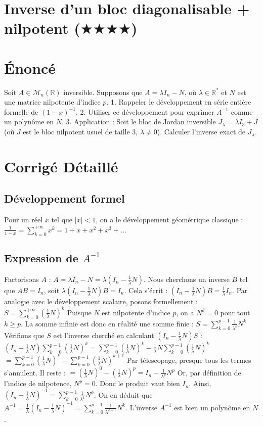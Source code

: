 \documentclass[11pt,a4paper]{article}
\begin{document}
\section{Inverse d'un bloc diagonalisable + nilpotent ($\bigstar$$\bigstar$$\bigstar$$\bigstar$)}

\section{Énoncé}
Soit $A \in \mathcal{M}_n(\mathbb{R})$ inversible.
Supposons que $A = \lambda I_n - N$, où $\lambda \in \mathbb{R}^*$ et $N$ est une matrice nilpotente d'indice $p$.
1. Rappeler le développement en série entière formelle de $(1 - x)^{-1}$.
2. Utiliser ce développement pour exprimer $A^{-1}$ comme un polynôme en $N$.
3. Application : Soit le bloc de Jordan inversible $J_{\lambda} = \lambda I_3 + J$ (où $J$ est le bloc nilpotent usuel de taille 3, $\lambda \neq 0$). Calculer l'inverse exact de $J_{\lambda}$.

\section{Corrigé Détaillé}

\subsection{Développement formel}
Pour un réel $x$ tel que $|x| < 1$, on a le développement géométrique classique :
$\frac{1}{1 - x} = \sum_{k=0}^{+\infty} x^k = 1 + x + x^2 + x^3 + \dots$

\subsection{Expression de $A^{-1}$}
Factorisons $A$ :
$A = \lambda I_n - N = \lambda (I_n - \frac{1}{\lambda} N)$.
Nous cherchons un inverse $B$ tel que $A B = I_n$, soit $\lambda (I_n - \frac{1}{\lambda} N) B = I_n$.
Cela s'écrit : $(I_n - \frac{1}{\lambda} N) B = \frac{1}{\lambda} I_n$.
Par analogie avec le développement scalaire, posons formellement :
$S = \sum_{k=0}^{+\infty} (\frac{1}{\lambda} N)^k$
Puisque $N$ est nilpotente d'indice $p$, on a $N^k = 0$ pour tout $k \ge p$.
La somme infinie est donc en réalité une somme finie :
$S = \sum_{k=0}^{p-1} \frac{1}{\lambda^k} N^k$
Vérifions que $S$ est l'inverse cherché en calculant $(I_n - \frac{1}{\lambda} N) S$ :
$(I_n - \frac{1}{\lambda} N) \sum_{k=0}^{p-1} (\frac{1}{\lambda} N)^k = \sum_{k=0}^{p-1} (\frac{1}{\lambda} N)^k - \frac{1}{\lambda} N \sum_{k=0}^{p-1} (\frac{1}{\lambda} N)^k$
$= \sum_{k=0}^{p-1} (\frac{1}{\lambda} N)^k - \sum_{k=0}^{p-1} (\frac{1}{\lambda} N)^{k+1}$
Par télescopage, presque tous les termes s'annulent. Il reste :
$= (\frac{1}{\lambda} N)^0 - (\frac{1}{\lambda} N)^p = I_n - \frac{1}{\lambda^p} N^p$
Or, par définition de l'indice de nilpotence, $N^p = 0$.
Donc le produit vaut bien $I_n$.
Ainsi, $(I_n - \frac{1}{\lambda} N)^{-1} = \sum_{k=0}^{p-1} \frac{1}{\lambda^k} N^k$.
On en déduit que $A^{-1} = \frac{1}{\lambda} (I_n - \frac{1}{\lambda} N)^{-1} = \sum_{k=0}^{p-1} \frac{1}{\lambda^{k+1}} N^k$.
L'inverse $A^{-1}$ est bien un polynôme en $N$.
\end{document}
